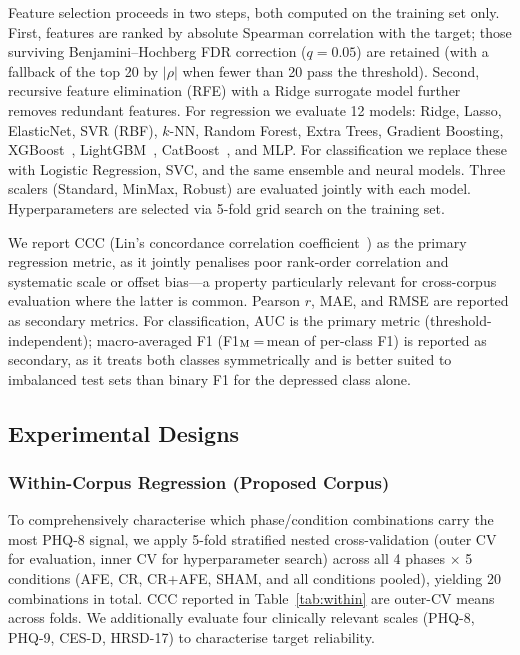 \documentclass[sigconf]{acmart}
\begin{document}
Feature selection proceeds in two steps, both computed on the training set only.
First, features are ranked by absolute Spearman correlation with the target; those
surviving Benjamini--Hochberg FDR correction ($q = 0.05$) are retained (with a fallback
of the top 20 by $|\rho|$ when fewer than 20 pass the threshold).
Second, recursive feature elimination (RFE) with a Ridge surrogate model further removes
redundant features.
For regression we evaluate 12 models: Ridge, Lasso, ElasticNet, SVR (RBF), $k$-NN,
Random Forest, Extra Trees, Gradient Boosting, XGBoost~\cite{chen2016xgboost},
LightGBM~\cite{ke2017lightgbm}, CatBoost~\cite{prokhorenkova2018catboost}, and MLP.
For classification we replace these with Logistic Regression, SVC, and the same
ensemble and neural models.
Three scalers (Standard, MinMax, Robust) are evaluated jointly with each model.
Hyperparameters are selected via 5-fold grid search on the training set.

We report CCC (Lin's concordance correlation coefficient~\cite{lin1989ccc}) as the primary
regression metric, as it jointly penalises poor rank-order correlation and systematic
scale or offset bias---a property particularly relevant for cross-corpus evaluation
where the latter is common. Pearson $r$, MAE, and RMSE are reported as secondary metrics.
For classification, AUC is the primary metric (threshold-independent); macro-averaged
F1 (F1$_{\rm M}$\,=\,mean of per-class F1) is reported as secondary, as it treats both
classes symmetrically and is better suited to imbalanced test sets than binary F1 for
the depressed class alone.

\subsection{Experimental Designs}
\label{sec:experiments}

\subsubsection{Within-Corpus Regression (Proposed Corpus)}
\label{sec:within}

To comprehensively characterise which phase/condition combinations carry the most
PHQ-8 signal, we apply 5-fold stratified nested cross-validation (outer CV for evaluation,
inner CV for hyperparameter search) across all 4 phases $\times$ 5 conditions (AFE, CR,
CR+AFE, SHAM, and all conditions pooled), yielding 20 combinations in total.
CCC reported in Table~\ref{tab:within} are outer-CV means across folds.
We additionally evaluate four clinically relevant scales (PHQ-8, PHQ-9, CES-D, HRSD-17)
to characterise target reliability.
\end{document}
